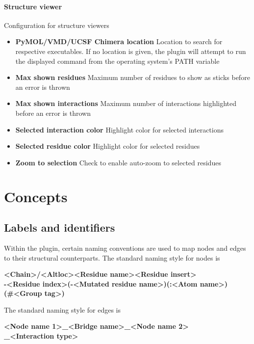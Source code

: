 \paragraph{Structure viewer} Configuration for structure viewers
\begin{itemize}
\item \textbf{PyMOL/VMD/UCSF Chimera location} Location to search for respective executables. If no location is given, the plugin will attempt to run the displayed command from the operating system's PATH variable
\item \textbf{Max shown residues} Maximum number of residues to show as sticks before an error is thrown
\item \textbf{Max shown interactions} Maximum number of interactions highlighted before an error is thrown
\item \textbf{Selected interaction color} Highlight color for selected interactions
\item \textbf{Selected residue color} Highlight color for selected residues
\item \textbf{Zoom to selection} Check to enable auto-zoom to selected residues
\end{itemize}

\section{Concepts}

\subsection{Labels and identifiers}
\label{sec:labels}

Within the plugin, certain naming conventions are used to map nodes and edges to their structural counterparts. The standard naming style for nodes is

\textbf{\textless Chain\textgreater /\textless Altloc\textgreater \textless Residue name\textgreater \textless Residue insert\textgreater \\-\textless Residue index\textgreater (-\textless Mutated residue name\textgreater )(:\textless Atom name\textgreater )\\(\#\textless Group tag\textgreater )}

The standard naming style for edges is

\textbf{\textless Node name 1\textgreater \_\textless Bridge name\textgreater \_\textless Node name 2\textgreater\\ \_\textless Interaction type\textgreater}

